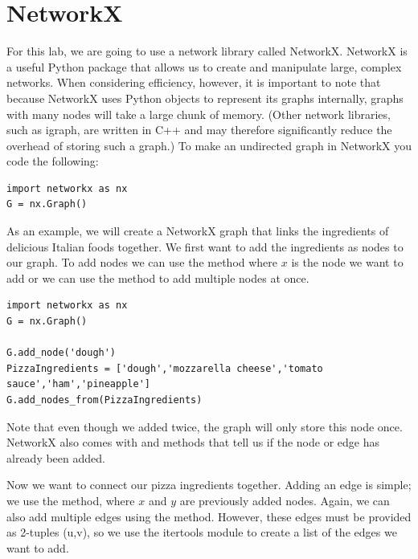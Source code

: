 \section*{NetworkX}
For this lab, we are going to use a network library called NetworkX. NetworkX is a useful Python package that allows us to create and manipulate large, complex networks.
When considering efficiency, however, it is important to note that because NetworkX uses Python objects to represent its graphs internally, graphs with many nodes will
take a large chunk of memory. (Other network libraries, such as igraph, are written in C++ and may therefore significantly reduce the overhead of storing such a graph.)
To make an undirected graph in NetworkX you code the following:

\begin{lstlisting}
import networkx as nx
G = nx.Graph()
\end{lstlisting}

As an example, we will create a NetworkX graph that links the ingredients of delicious Italian foods together. We first want to add the ingredients as nodes to our graph.
To add nodes we can use the  method where $x$ is the node we want to add or we can use the  method to add multiple nodes at once.

\begin{lstlisting}
import networkx as nx
G = nx.Graph()

G.add_node('dough')
PizzaIngredients = ['dough','mozzarella cheese','tomato sauce','ham','pineapple']
G.add_nodes_from(PizzaIngredients)
\end{lstlisting}
Note that even though we added  twice, the graph will only store this node once. NetworkX also comes with  and  methods that tell
us if the node  or edge  has already been added.

Now we want to connect our pizza ingredients together. Adding an edge is simple; we use the  method, where $x$ and $y$ are previously added nodes.
Again, we can also add multiple edges using the  method. However, these edges must be provided as 2-tuples (u,v), so we use the itertools module to create a list of the edges we want to add.

